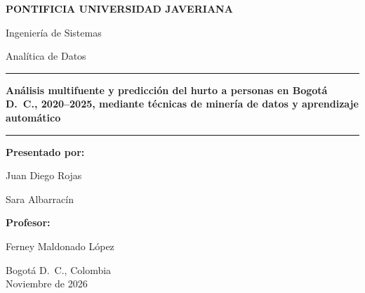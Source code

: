\begin{titlepage}
  \thispagestyle{empty}
  \begin{center}
    {\large\bfseries PONTIFICIA UNIVERSIDAD JAVERIANA\par}
    \vspace{0.5cm}
    {\large Ingeniería de Sistemas\par}
    \vspace{0.2cm}
    {\large Analítica de Datos\par}
    \vfill
    {\color{azulj}\rule{0.8\textwidth}{1.2pt}\par}
    \vspace{0.6cm}
    {\LARGE\bfseries Análisis multifuente y predicción del hurto a personas en Bogotá D.~C., 2020--2025, mediante técnicas de minería de datos y aprendizaje automático\par}
    \vspace{0.6cm}
    {\color{azulj}\rule{0.8\textwidth}{1.2pt}\par}
    \vspace{0.6cm}
    {\large\bfseries\entregaactual\par}
    {\normalsize\entregasubtitulo\par}
    \vfill
    {\large\bfseries Presentado por:\par}
    {\large Juan Diego Rojas\par}
    {\large Sara Albarracín\par}
    \vspace{0.8cm}
    {\large\bfseries Profesor:\par}
    {\large Ferney Maldonado López\par}
    \vfill
    Bogotá D.~C., Colombia\\
    Noviembre de 2026
  \end{center}
\end{titlepage}
